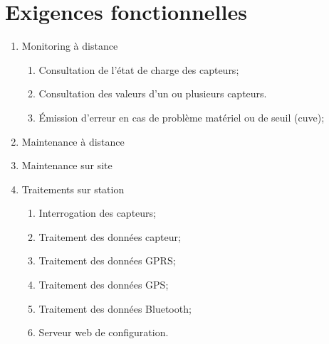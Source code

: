 
\section{Exigences fonctionnelles}

    \begin{enumerate}

    
        \item Monitoring à distance
            \begin{enumerate}
                \item Consultation de l'état de charge des capteurs;
                \item Consultation des valeurs d'un ou plusieurs
                         capteurs.
                \item Émission d'erreur en cas de problème matériel
                            ou de seuil (cuve);
            \end{enumerate}

        \item Maintenance à distance
        
        \item Maintenance sur site

        \item Traitements sur station
            \begin{enumerate}
                \item Interrogation des capteurs;
                \item Traitement des données capteur;
                \item Traitement des données GPRS;
                \item Traitement des données GPS;
                \item Traitement des données Bluetooth;
                \item Serveur web de configuration.
            \end{enumerate}
    \end{enumerate}

